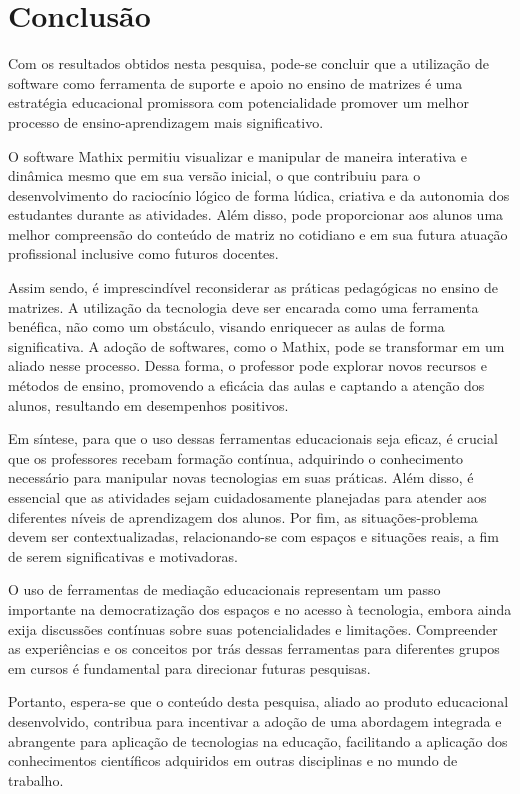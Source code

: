 
\chapter{Conclusão}
\label{conclusao}

Com os resultados obtidos nesta pesquisa, pode-se concluir que a utilização de software como ferramenta de suporte e apoio no ensino de matrizes é uma estratégia educacional promissora com potencialidade promover um melhor processo de ensino-aprendizagem mais significativo.

O software Mathix permitiu visualizar e manipular de maneira interativa e dinâmica mesmo que em sua versão inicial, o que contribuiu para o desenvolvimento do raciocínio lógico de forma lúdica, criativa e da autonomia dos estudantes durante as atividades. Além disso, pode proporcionar aos alunos uma melhor compreensão do conteúdo de matriz no cotidiano e em sua futura atuação profissional inclusive como futuros docentes.


Assim sendo, é imprescindível reconsiderar as práticas pedagógicas no ensino de matrizes. A utilização da tecnologia deve ser encarada como uma ferramenta benéfica, não como um obstáculo, visando enriquecer as aulas de forma significativa. A adoção de softwares, como o Mathix, pode se transformar em um aliado nesse processo. Dessa forma, o professor pode explorar novos recursos e métodos de ensino, promovendo a eficácia das aulas e captando a atenção dos alunos, resultando em desempenhos positivos.


Em síntese, para que o uso dessas ferramentas educacionais seja eficaz, é crucial que os professores recebam formação contínua, adquirindo o conhecimento necessário para manipular novas tecnologias em suas práticas. Além disso, é essencial que as atividades sejam cuidadosamente planejadas para atender aos diferentes níveis de aprendizagem dos alunos. Por fim, as situações-problema devem ser contextualizadas, relacionando-se com espaços e situações reais, a fim de serem significativas e motivadoras.

O uso de ferramentas de mediação educacionais representam um passo importante na democratização dos espaços e no acesso à tecnologia, embora ainda exija discussões contínuas sobre suas potencialidades e limitações. Compreender as experiências e os conceitos por trás dessas ferramentas para diferentes grupos em cursos é fundamental para direcionar futuras pesquisas.


Portanto, espera-se que o conteúdo desta pesquisa, aliado ao produto educacional desenvolvido, contribua para incentivar a adoção de uma abordagem integrada e abrangente para aplicação de tecnologias na educação, facilitando a aplicação dos conhecimentos científicos adquiridos em outras disciplinas e no mundo de trabalho.



